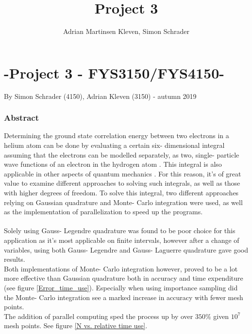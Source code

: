 \documentclass[10pt,a4paper]{article}
\author{Adrian Martinsen Kleven, Simon Schrader}
\title{Project 3}
\begin{document}
\part*{-Project 3 - FYS3150/FYS4150-
}
{\large By Simon Schrader (4150), Adrian Kleven (3150) - autumn 2019
}
\tableofcontents

\listoffigures
\listoftables
\clearpage
 
\section{Abstract}
Determining the ground state correlation energy between two electrons in a helium atom can be done by evaluating a certain six- dimensional integral assuming that the electrons can be modelled separately, as two, single- particle wave functions of an electron in the hydrogen atom \cite{Problem_set_3}. This integral is also applicable in other aspects of quantum mechanics \cite{Problem_set_3}. For this reason, it's of great value to examine different approaches to solving such integrals, as well as those with higher degrees of freedom. To solve this integral, two different approaches relying on Gaussian quadrature and Monte- Carlo integration were used, as well as the implementation of parallelization to speed up the programs.\\\\Solely using Gauss- Legendre quadrature was found to be poor choice for this application as it's most applicable on finite intervals, however after a change of variables, using both Gauss- Legendre and Gauss- Laguerre quadrature gave good results.\\Both implementations of Monte- Carlo integration however, proved to be a lot more effective than Gaussian quadrature both in accuracy and time expenditure (see figure \ref{Error_time_use}). Especially when using importance sampling did the Monte- Carlo integration see a marked increase in accuracy with fewer mesh points.\\The addition of parallel computing sped the process up by over $350\%$ given $10^7$ mesh points. See figure \ref{N vs. relative time use}.
\end{document}
